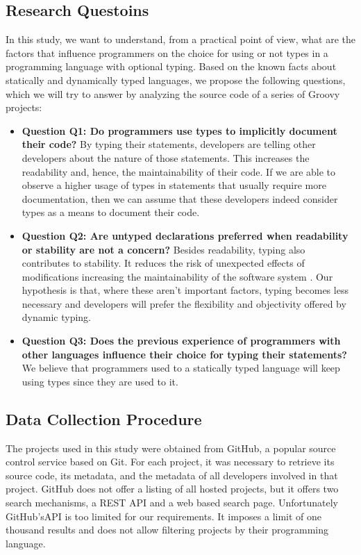 \documentclass[preprint]{sigplanconf}
\begin{document}
\subsection{Research Questoins\label{questions}}

In this study, we want to understand, from a practical point of view, what are the factors that influence programmers on the choice for using or not types in a programming language with optional typing.
Based on the known facts about statically and dynamically typed languages, we propose the following questions, which we will try to answer by analyzing the source code of a series of Groovy projects:

\begin{itemize}
	\item \textbf{Question Q1: Do programmers use types to implicitly document their code?} By typing their statements, developers are telling other developers about the nature of those statements. This increases the readability and, hence, the maintainability of their code. If we are able to observe a higher usage of types in statements that usually require more documentation, then we can assume that these developers indeed consider types as a means to document their code.
	\item \textbf{Question Q2: Are untyped declarations preferred when readability or stability are not a concern?} Besides readability, typing also contributes to stability. It reduces the risk of unexpected effects of modifications increasing the maintainability of the software system \cite{Iso2004}. Our hypothesis is that, where these aren't important factors, typing becomes less necessary and developers will prefer the flexibility and objectivity offered by dynamic typing. 
	\item \textbf{Question Q3: Does the previous experience of programmers with other languages influence their choice for typing their statements?} We believe that programmers used to a statically typed language will keep using types since they are used to it. 
\end{itemize}

\subsection{Data Collection Procedure\label{dataCollection}}
The projects used in this study were obtained from GitHub, a popular source control service based on Git.
For each project, it was necessary to retrieve its source code, its metadata, and the metadata of all developers involved in that project.
GitHub does not offer a listing of all hosted projects, but it offers two search mechanisms, a REST API and a web based search page.
Unfortunately GitHub'sAPI is too limited for our requirements.
It imposes a limit of one thousand results and does not allow filtering projects by their programming language.
\end{document}
